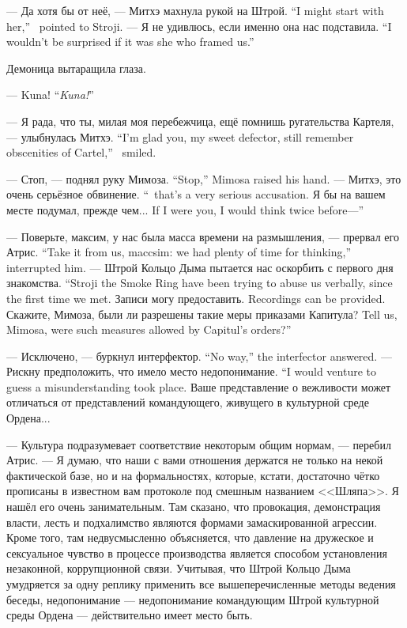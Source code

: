 {--- Да хотя бы от неё, --- Митхэ махнула рукой на Штрой.}
{``I might start with her,'' \Mitchoe\ pointed to Stroji.}
{--- Я не удивлюсь, если именно она нас подставила.}
{``I wouldn't be surprised if it was she who framed us.''}

Демоница вытаращила глаза.

{--- Kuna!}
{``\emph{Kuna!}''}

{--- Я рада, что ты, милая моя перебежчица, ещё помнишь ругательства Картеля, --- улыбнулась Митхэ.}
{``I'm glad you, my sweet defector, still remember obscenities of Cartel,'' \Mitchoe\ smiled.}

{--- Стоп, --- поднял руку Мимоза.}
{``Stop,'' Mimosa raised his hand.}
{--- Митхэ, это очень серьёзное обвинение.}
{``\Mitchoe\, that's a very serious accusation.}
{Я бы на вашем месте подумал, прежде чем...}
{If I were you, I would think twice before---''}

{--- Поверьте, максим, у нас была масса времени на размышления, --- прервал его Атрис.}
{``Take it from us, maccsim: we had plenty of time for thinking,'' \Aatris{} interrupted him.}
{--- Штрой Кольцо Дыма пытается нас оскорбить с первого дня знакомства.}
{``Stroji the Smoke Ring have been trying to abuse us verbally, since the first time we met.}
{Записи могу предоставить.}
{Recordings can be provided.}
{Скажите, Мимоза, были ли разрешены такие меры приказами Капитула?}
{Tell us, Mimosa, were such measures allowed by Capitul's orders?''}

{--- Исключено, --- буркнул интерфектор.}
{``No way,'' the interfector answered.}
{--- Рискну предположить, что имело место недопонимание.}
{``I would venture to guess a misunderstanding took place.}
Ваше представление о вежливости может отличаться от представлений командующего, живущего в культурной среде Ордена...

--- Культура подразумевает соответствие некоторым общим нормам, --- перебил Атрис.
--- Я думаю, что наши с вами отношения держатся не только на некой фактической базе, но и на формальностях, которые, кстати, достаточно чётко прописаны в известном вам протоколе под смешным названием <<Шляпа>>.
Я нашёл его очень занимательным.
Там сказано, что провокация, демонстрация власти, лесть и подхалимство являются формами замаскированной агрессии.
Кроме того, там недвусмысленно объясняется, что давление на дружеское и сексуальное чувство в процессе производства является способом установления незаконной, коррупционной связи.
Учитывая, что Штрой Кольцо Дыма умудряется за одну реплику применить все вышеперечисленные методы ведения беседы, недопонимание --- недопонимание командующим Штрой культурной среды Ордена --- действительно имеет место быть.

